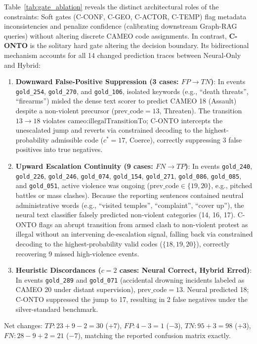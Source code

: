 \documentclass[11pt,a4paper]{article}
\begin{document}
\noindent
Table~\ref{tab:gate_ablation} reveals the distinct architectural roles of the constraints:
Soft gates (C-CONF, C-GEO, C-ACTOR, C-TEMP) flag metadata inconsistencies and penalize confidence (calibrating downstream Graph-RAG queries) without altering discrete CAMEO code assignments.
In contrast, \textbf{C-ONTO} is the solitary hard gate altering the decision boundary. Its bidirectional mechanism accounts for all 14 changed prediction traces between Neural-Only and Hybrid:
\begin{enumerate}
  \item \textbf{Downward False-Positive Suppression (3 cases: $FP \to TN$)}: In events \texttt{gold\_254}, \texttt{gold\_270}, and \texttt{gold\_106}, isolated keywords (e.g., ``death threats'', ``firearms'') misled the dense text scorer to predict CAMEO 18 (Assault) despite a non-violent precursor ($\text{prev\_code} = 13$, Threaten). The transition $13 \to 18$ violates $\text{cameo:illegalTransitionTo}$; C-ONTO intercepts the unescalated jump and reverts via constrained decoding to the highest-probability admissible code ($c^* = 17$, Coerce), correctly suppressing 3 false positives into true negatives.
  \item \textbf{Upward Escalation Continuity (9 cases: $FN \to TP$)}: In events \texttt{gold\_240}, \texttt{gold\_226}, \texttt{gold\_246}, \texttt{gold\_074}, \texttt{gold\_154}, \texttt{gold\_271}, \texttt{gold\_086}, \texttt{gold\_085}, and \texttt{gold\_051}, active violence was ongoing ($\text{prev\_code} \in \{19, 20\}$, e.g., pitched battles or mass clashes). Because the reporting sentences contained neutral administrative words (e.g., ``visited temples'', ``complaint'', ``cover up''), the neural text classifier falsely predicted non-violent categories (14, 16, 17). C-ONTO flags an abrupt transition from armed clash to non-violent protest as illegal without an intervening de-escalation signal, falling back via constrained decoding to the highest-probability valid codes ($\{18, 19, 20\}$), correctly recovering 9 missed high-violence events.
  \item \textbf{Heuristic Discordances ($c=2$ cases: Neural Correct, Hybrid Erred)}: In events \texttt{gold\_289} and \texttt{gold\_071} (accidental drowning incidents labeled as CAMEO 20 under distant supervision), $\text{prev\_code}=13$. Neural predicted 18; C-ONTO suppressed the jump to 17, resulting in 2 false negatives under the silver-standard benchmark.
\end{enumerate}
Net changes: $TP: 23 + 9 - 2 = 30$ ($+7$), $FP: 4 - 3 = 1$ ($-3$), $TN: 95 + 3 = 98$ ($+3$), $FN: 28 - 9 + 2 = 21$ ($-7$), matching the reported confusion matrix exactly.
\end{document}
